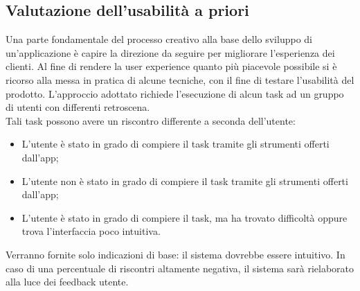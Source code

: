 \documentclass{natourDoc}
\begin{document}
\newpage

\subsection{Valutazione dell'usabilità a priori}
Una parte fondamentale del processo creativo alla base dello sviluppo di un'applicazione è capire la direzione da seguire per migliorare l’esperienza dei clienti.
Al fine di rendere la user experience quanto più piacevole possibile si è ricorso alla messa in pratica di alcune tecniche, con il fine di testare l’usabilità del prodotto.
L’approccio adottato richiede l'esecuzione di alcun task ad un gruppo di utenti con differenti retroscena. \\

Tali task possono avere un riscontro differente a seconda dell'utente:
\begin{itemize}
	\item L’utente è stato in grado di compiere il task tramite gli strumenti offerti dall’app;
	\item L’utente non è stato in grado di compiere il task tramite gli strumenti offerti dall’app;
	\item L'utente è stato in grado di compiere il task, ma ha trovato difficoltà oppure trova l'interfaccia poco intuitiva.
\end{itemize}

Verranno fornite solo indicazioni di base: il sistema dovrebbe essere intuitivo. In caso di una percentuale di riscontri altamente
negativa, il sistema sarà rielaborato alla luce dei feedback utente.
\end{document}
